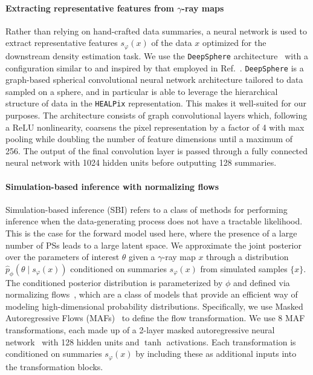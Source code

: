 \documentclass[]{article}
\begin{document}
\paragraph{Extracting representative features from $\gamma$-ray maps} Rather than relying on hand-crafted data summaries, a neural network is used to extract representative features $s_\varphi(x)$ of the data $x$ optimized for the downstream density estimation task. We use the \texttt{DeepSphere} architecture~\cite{defferrard2020deepsphere,Perraudin:2018rbt,deepsphere_rlgm} with a configuration similar to and inspired by that employed in Ref.~\cite{List:2020mzd}. \texttt{DeepSphere} is a graph-based spherical convolutional neural network architecture tailored to data sampled on a sphere, and in particular is able to leverage the hierarchical structure of data in the \texttt{HEALPix} representation. This makes it well-suited for our purposes. The architecture consists of graph convolutional layers which, following a ReLU nonlinearity, coarsens the pixel representation by a factor of 4 with max pooling while doubling the number of feature dimensions until a maximum of 256. The output of the final convolution layer is passed through a fully connected neural network with 1024 hidden units before outputting 128 summaries.

\paragraph{Simulation-based inference with normalizing flows} Simulation-based inference (SBI) refers to a class of methods for performing inference when the data-generating process does not have a tractable likelihood. This is the case for the forward model used here, where the presence of a large number of PSs leads to a large latent space. We approximate the joint posterior over the parameters of interest $\theta$ given a $\gamma$-ray map $x$ through a distribution $\hat p_\phi(\theta\mid s_\varphi(x))$ conditioned on summaries $s_\varphi(x)$ from simulated samples $\{x\}$. The conditioned posterior distribution is parameterized by $\phi$ and defined via normalizing flows~\cite{papamakarios2019normalizing,rezende2015variational}, which are a class of models that provide an efficient way of modeling high-dimensional probability distributions. Specifically, we use Masked Autoregressive Flows (MAFs)~\cite{10.5555/3294771.3294994} to define the flow transformation. We use 8 MAF transformations, each made up of a 2-layer masked autoregressive neural network~\cite{germain2015made} with 128 hidden units and $\tanh$ activations. 
Each transformation is conditioned on summaries $s_\varphi(x)$ by including these as additional inputs into the transformation blocks.
\end{document}
